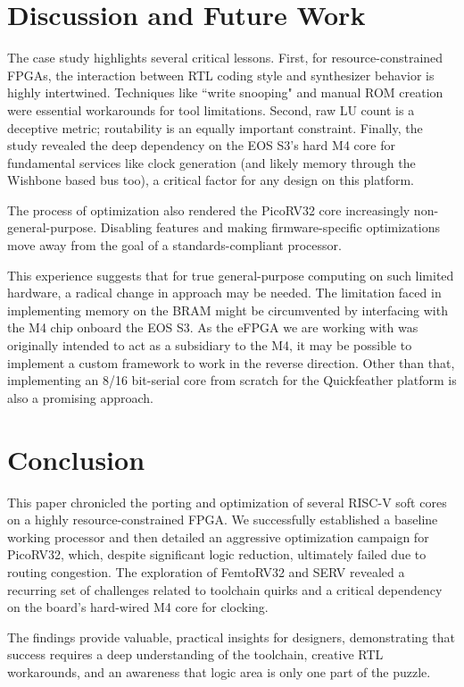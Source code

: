 \documentclass[conference]{IEEEtran}
\begin{document}
\section{Discussion and Future Work}
The case study highlights several critical lessons. First, for resource-constrained FPGAs, the interaction between RTL coding style and synthesizer behavior is highly intertwined. Techniques like ``write snooping" and manual ROM creation were essential workarounds for tool limitations. Second, raw LU count is a deceptive metric; routability is an equally important constraint. Finally, the study revealed the deep dependency on the EOS S3's hard M4 core for fundamental services like clock generation (and likely memory through the Wishbone based bus too), a critical factor for any design on this platform.

The process of optimization also rendered the PicoRV32 core increasingly non-general-purpose. Disabling features and making firmware-specific optimizations move away from the goal of a standards-compliant processor.

This experience suggests that for true general-purpose computing on such limited hardware, a radical change in approach may be needed. The limitation faced in implementing memory on the BRAM might be circumvented by interfacing with the M4 chip onboard the EOS S3. As the eFPGA we are working with was originally intended to act as a subsidiary to the M4, it may be possible to implement a custom framework to work in the reverse direction. Other than that, implementing an 8/16 bit-serial core from scratch for the Quickfeather platform is also a promising approach.

\section{Conclusion}
This paper chronicled the porting and optimization of several RISC-V soft cores on a highly resource-constrained FPGA. We successfully established a baseline working processor and then detailed an aggressive optimization campaign for PicoRV32, which, despite significant logic reduction, ultimately failed due to routing congestion. The exploration of FemtoRV32 and SERV revealed a recurring set of challenges related to toolchain quirks and a critical dependency on the board's hard-wired M4 core for clocking.

The findings provide valuable, practical insights for designers, demonstrating that success requires a deep understanding of the toolchain, creative RTL workarounds, and an awareness that logic area is only one part of the puzzle. %



\end{document}
